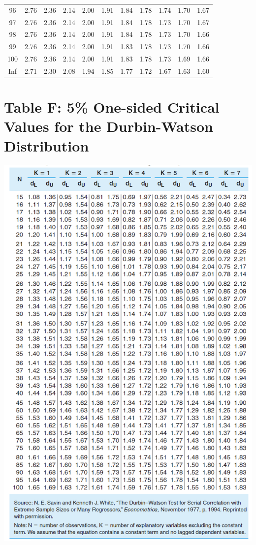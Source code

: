 \documentclass[
]{book}
\theoremstyle{definition}
\theoremstyle{definition}
\theoremstyle{definition}
\theoremstyle{definition}
\theoremstyle{remark}
\begin{document}
\begin{longtable}[]{@{}ccccccccccc@{}}
96 & 2.76 & 2.36 & 2.14 & 2.00 & 1.91 & 1.84 & 1.78 & 1.74 & 1.70 & 1.67 \\
97 & 2.76 & 2.36 & 2.14 & 2.00 & 1.91 & 1.84 & 1.78 & 1.73 & 1.70 & 1.67 \\
98 & 2.76 & 2.36 & 2.14 & 2.00 & 1.91 & 1.84 & 1.78 & 1.73 & 1.70 & 1.66 \\
99 & 2.76 & 2.36 & 2.14 & 2.00 & 1.91 & 1.83 & 1.78 & 1.73 & 1.70 & 1.66 \\
100 & 2.76 & 2.36 & 2.14 & 2.00 & 1.91 & 1.83 & 1.78 & 1.73 & 1.69 & 1.66 \\
Inf & 2.71 & 2.30 & 2.08 & 1.94 & 1.85 & 1.77 & 1.72 & 1.67 & 1.63 & 1.60 \\
\end{longtable}

\hypertarget{table-f-5-one-sided-critical-values-for-the-durbin-watson-distribution}{%
\section*{Table F: 5\% One-sided Critical Values for the Durbin-Watson Distribution}\label{table-f-5-one-sided-critical-values-for-the-durbin-watson-distribution}}

\includegraphics{images/durbin.png}

  
\end{document}

